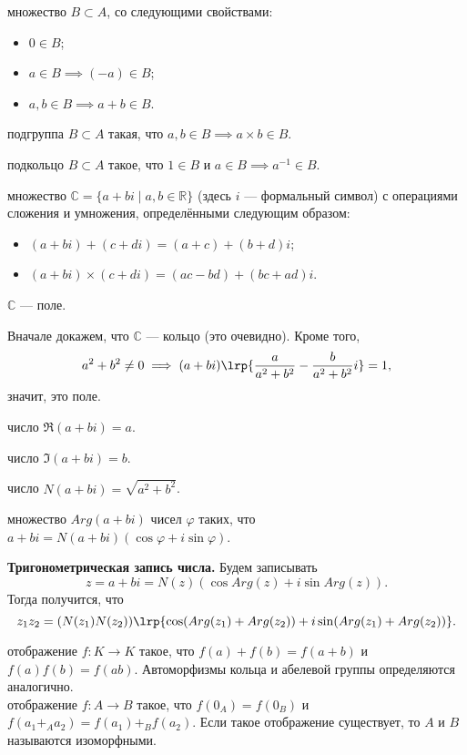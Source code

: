 \documentclass[12pt,a4paper]{article}
\begin{document}
 множество $B\subset A$, со следующими свойствами:

\begin{itemize}
	\item $0\in B$;
	\item $a\in B\implies (-a)\in B$;
	\item $a,b\in B\implies a+b\in B$.
\end{itemize}

 подгруппа $B\subset A$ такая, что $a,b\in B\implies a\times b\in B$.

 подкольцо $B\subset A$ такое, что $1\in B$ и $a\in B\implies a^{-1}\in B$.

 множество $\mathbb C=\{a+bi\mid a,b\in \mathbb R\}$ (здесь $i$ --- формальный символ) с операциями сложения и умножения, определёнными следующим образом:

\begin{itemize}
	\item $(a+bi)+(c+di)=(a+c)+(b+d)i$;
	\item $(a+bi)\times (c+di)=(ac-bd)+(bc+ad)i$.
\end{itemize}

\theorem $\mathbb C$ --- поле.

\proof Вначале докажем, что $\mathbb C$ --- кольцо (это очевидно). Кроме того, \[
	a^2+b^2\neq 0\implies (a+bi)\lrp{\frac{a}{a^2+b^2}-\frac{b}{a^2+b^2}i}=1
,\] значит, это поле.\QEDA
\newpage

 число $\Re(a+bi)=a$.

 число $\Im(a+bi)=b$.

 число $N(a+bi)=\sqrt{a^2+b^2}$.

 множество $Arg(a+bi)$ чисел $\varphi$ таких, что $a+bi=N(a+bi)(\cos\varphi+i\sin\varphi)$.

\textbf{Тригонометрическая запись числа.} Будем записывать \[
	z=a+bi=N(z)(\cos Arg(z)+i\sin Arg(z))
.\]
Тогда получится, что \[
	z_1z_2=(N(z_1)N(z_2))\lrp{\cos (Arg(z_1)+Arg(z_2))+i\sin(Arg(z_1)+Arg(z_2))}
.\]

 отображение $f:K\to K$ такое, что $f(a)+f(b)=f(a+b)$ и $f(a)f(b)=f(ab)$. Автоморфизмы кольца и абелевой группы определяются аналогично.\\

 отображение $f:A\to B$ такое, что $f(0_A)=f(0_B)$ и $f(a_1+_A a_2)=f(a_1)+_B f(a_2)$. Если такое отображение существует, то $A$ и $B$ называются изоморфными.\\
\end{document}
